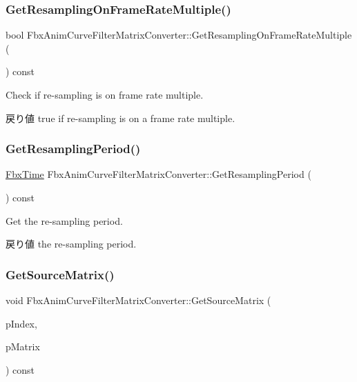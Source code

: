 \subsubsection{\texorpdfstring{Get\+Resampling\+On\+Frame\+Rate\+Multiple()}{GetResamplingOnFrameRateMultiple()}}
{\footnotesize\ttfamily bool Fbx\+Anim\+Curve\+Filter\+Matrix\+Converter\+::\+Get\+Resampling\+On\+Frame\+Rate\+Multiple (\begin{DoxyParamCaption}{ }\end{DoxyParamCaption}) const}

Check if re-\/sampling is on frame rate multiple. \begin{DoxyReturn}{戻り値}
{\ttfamily true} if re-\/sampling is on a frame rate multiple. 
\end{DoxyReturn}
\mbox{\label{class_fbx_anim_curve_filter_matrix_converter_a30366999bdf8a54362cb07415cb09d67}} 
\subsubsection{\texorpdfstring{Get\+Resampling\+Period()}{GetResamplingPeriod()}}
{\footnotesize\ttfamily \hyperlink{class_fbx_time}{Fbx\+Time} Fbx\+Anim\+Curve\+Filter\+Matrix\+Converter\+::\+Get\+Resampling\+Period (\begin{DoxyParamCaption}{ }\end{DoxyParamCaption}) const}

Get the re-\/sampling period. \begin{DoxyReturn}{戻り値}
the re-\/sampling period. 
\end{DoxyReturn}
\mbox{\label{class_fbx_anim_curve_filter_matrix_converter_a38313c4b68b33172198ca19ef957bc1c}} 
\subsubsection{\texorpdfstring{Get\+Source\+Matrix()}{GetSourceMatrix()}}
{\footnotesize\ttfamily void Fbx\+Anim\+Curve\+Filter\+Matrix\+Converter\+::\+Get\+Source\+Matrix (\begin{DoxyParamCaption}\item[{\hyperlink{class_fbx_anim_curve_filter_matrix_converter_a41638d5acd6d14ef0f095ab75b18ee69}{E\+Matrix\+Index}}]{p\+Index,  }\item[{\hyperlink{class_fbx_a_matrix}{Fbx\+A\+Matrix} \&}]{p\+Matrix }\end{DoxyParamCaption}) const}


